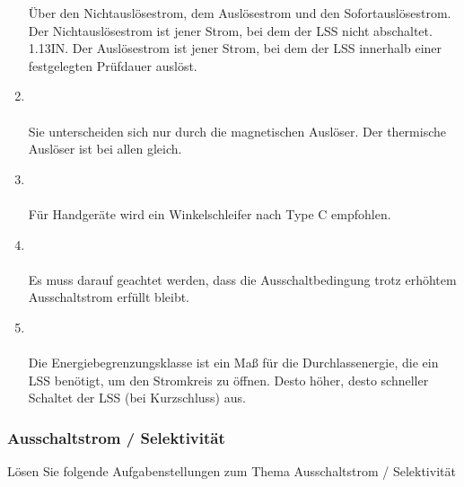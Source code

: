\begin{enumerate}
            Über den Nichtauslösestrom, dem Auslösestrom und den Sofortauslösestrom. Der Nichtauslösestrom ist jener Strom, bei dem der LSS nicht abschaltet. 1.13IN. Der Auslösestrom ist jener Strom,
            bei dem der LSS innerhalb einer festgelegten Prüfdauer auslöst.
    \item   {} \\\\
            Sie unterscheiden sich nur durch die magnetischen Auslöser. Der thermische Auslöser ist bei allen gleich.
    \item   {} \\\\
            Für Handgeräte wird ein Winkelschleifer nach Type C empfohlen.
    \item   {} \\\\
            Es muss darauf geachtet werden, dass die Ausschaltbedingung trotz erhöhtem Ausschaltstrom erfüllt bleibt.

    \item   {} \\\\
            Die Energiebegrenzungsklasse ist ein Maß für die Durchlassenergie, die ein LSS benötigt, um den Stromkreis zu öffnen. Desto höher, desto schneller Schaltet der LSS 
            (bei Kurzschluss) aus.
\end{enumerate}

\subsubsection{Ausschaltstrom / Selektivität}
Lösen Sie folgende Aufgabenstellungen zum Thema Ausschaltstrom / Selektivität

